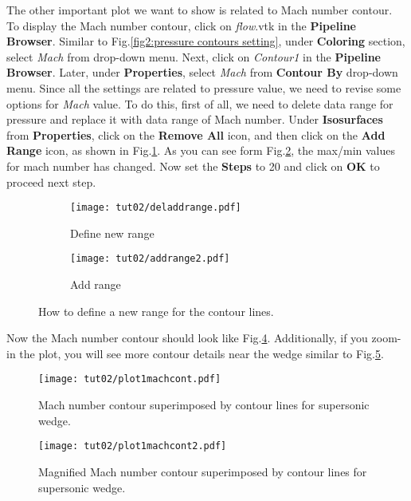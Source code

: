 The other important plot we want to show is related to Mach number contour. To display the Mach number contour, click on \textit{flow}.vtk in the \textbf{Pipeline Browser}. Similar to Fig.\ref{fig2:pressure contours setting}, under \textbf{Coloring} section, select \textit{Mach} from drop-down menu. Next, click on \textit{Contour1} in the \textbf{Pipeline Browser}. Later, under \textbf{Properties}, select \textit{Mach} from \textbf{Contour By} drop-down menu. Since all the settings are related to pressure value, we need to revise some options for \textit{Mach} value. To do this, first of all, we need to delete data range for pressure and replace it with data range of Mach number. Under \textbf{Isosurfaces} from \textbf{Properties}, click on the \textbf{Remove All} icon, and then click on the \textbf{Add Range} icon, as shown in Fig.\ref{fig2:contourby2 a}. As you can see form Fig.\ref{fig2:contourby2 b}, the max/min values for mach number has changed. Now set the \textbf{Steps} to 20 and click on \textbf{OK} to proceed next step.
\begin{figure}[htbp]
    \centering
     \begin{subfigure}[b]{.4\textwidth}
         \centering
         \texttt{[image: tut02/deladdrange.pdf]}
         \caption{Define new range}
         \label{fig2:contourby2 a}
     \end{subfigure}
     \hfill
     \begin{subfigure}[b]{.4\textwidth}
         \centering
         \texttt{[image: tut02/addrange2.pdf]}
         \caption{Add range}
         \label{fig2:contourby2 b}
     \end{subfigure}     
    \caption{How to define a new range for the contour lines.}
    \label{fig2:contourby2}
\end{figure}
Now the Mach number contour should look like Fig.\ref{fig2:mach_contour}. Additionally, if you zoom-in the plot, you will see more contour details near the wedge similar to Fig.\ref{fig2:mach_contour_zoom}.
\begin{figure}[htbp]
    \centering
    \texttt{[image: tut02/plot1machcont.pdf]}
    \caption{Mach number contour superimposed by contour lines for supersonic wedge.}
    \label{fig2:mach_contour}
\end{figure}
\begin{figure}[htbp]
    \centering
    \texttt{[image: tut02/plot1machcont2.pdf]}
    \caption{Magnified Mach number contour superimposed by contour lines for supersonic wedge.}
    \label{fig2:mach_contour_zoom}
\end{figure}
